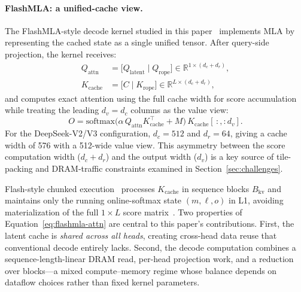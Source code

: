 \documentclass[sigconf, review, anonymous]{acmart}
\newcommand{\Bkv}{B_{\mathrm{kv}}}
\begin{document}
\paragraph{FlashMLA: a unified-cache view.}
The FlashMLA-style decode kernel studied in this
paper~\cite{flashmla2024gpu} implements MLA by representing the cached
state as a single unified tensor.  After query-side projection, the
kernel receives:
\begin{equation}\label{eq:flashmla-kernel}
  \begin{aligned}
    Q_{\mathrm{attn}} &= \bigl[Q_{\mathrm{latent}} \mid Q_{\mathrm{rope}}\bigr]
      \in \mathbb{R}^{1 \times (d_c + d_r)}, \\
    K_{\mathrm{cache}} &= \bigl[C \mid K_{\mathrm{rope}}\bigr]
      \in \mathbb{R}^{L \times (d_c + d_r)},
  \end{aligned}
\end{equation}
and computes exact attention using the full cache width for score
accumulation while treating the leading $d_v{=}d_c$ columns as the
value view:
\begin{equation}\label{eq:flashmla-attn}
  O = \mathrm{softmax}\!\bigl(
    \alpha\, Q_{\mathrm{attn}} K_{\mathrm{cache}}^\top + M
  \bigr)\, K_{\mathrm{cache}}[\,:,\!:\!d_v].
\end{equation}
For the DeepSeek-V2/V3 configuration, $d_c{=}512$ and $d_r{=}64$,
giving a cache width of 576 with a 512-wide value view.  This asymmetry
between the score computation width ($d_c+d_r$) and the output width
($d_v$) is a key source of tile-packing and DRAM-traffic constraints
examined in Section~\ref{sec:challenges}.

Flash-style chunked execution~\cite{dao2022flashattention} processes
$K_{\mathrm{cache}}$ in sequence blocks $\Bkv$ and maintains only the
running online-softmax state $(m, \ell, o)$ in L1, avoiding
materialization of the full $1 \times L$ score
matrix~\cite{flashmla2024gpu}.  Two properties of
Equation~\eqref{eq:flashmla-attn} are central to this paper's
contributions.  First, the latent cache is \emph{shared across all
heads}, creating cross-head data reuse that conventional decode entirely
lacks.  Second, the decode computation combines a sequence-length-linear
DRAM read, per-head projection work, and a reduction over blocks---a
mixed compute--memory regime whose balance depends on dataflow choices
rather than fixed kernel parameters.
\end{document}
